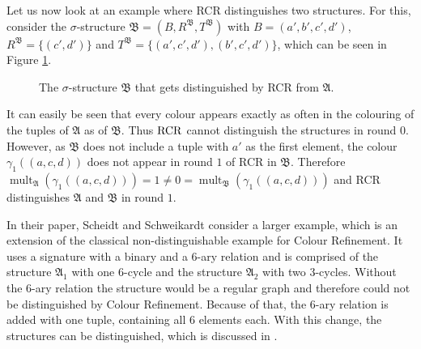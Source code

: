 Let us now look at an example where RCR distinguishes two structures.
For this, consider the $\sigma$-structure $\mathfrak B=(B, R^{\mathfrak B}, T^{\mathfrak B})$ with $B=(a',b',c',d')$, $R^{\mathfrak B}=\{(c',d')\}$ and $T^{\mathfrak B}=\{(a',c',d'),(b',c',d')\}$, which can be seen in Figure \ref{fig:distinguishedByRCR}.
\begin{figure}
	\centering
	\caption{The $\sigma$-structure $\mathfrak B$ that gets distinguished by RCR from $\mathfrak A$.}
	\label{fig:distinguishedByRCR}
\end{figure}
It can easily be seen that every colour appears exactly as often in the colouring of the tuples of $\mathfrak A$ as of $\mathfrak B$.
Thus $\operatorname{RCR}$ cannot distinguish the structures in round $0$.
However, as $\mathfrak B$ does not include a tuple with $a'$ as the first element, the colour $\gamma_1((a,c,d))$ does not appear in round $1$ of RCR in $\mathfrak B$.
Therefore $\operatorname{mult}_{\mathfrak A}(\gamma_1((a,c,d)))=1\neq 0 = \operatorname{mult}_{\mathfrak B}(\gamma_1((a,c,d)))$ and RCR distinguishes $\mathfrak A$ and $\mathfrak B$ in round $1$.

In their paper, Scheidt and Schweikardt consider a larger example, which is an extension of the classical non-distinguishable example for Colour Refinement.
It uses a signature with a binary and a $6$-ary relation and is comprised of the structure $\mathfrak A_1$ with one $6$-cycle and the structure $\mathfrak A_2$ with two $3$-cycles.
Without the $6$-ary relation the structure would be a regular graph and therefore could not be distinguished by Colour Refinement.
Because of that, the $6$-ary relation is added with one tuple, containing all $6$ elements each.
With this change, the structures can be distinguished, which is discussed in \cite{scheidt2025ColorRefinement}.

